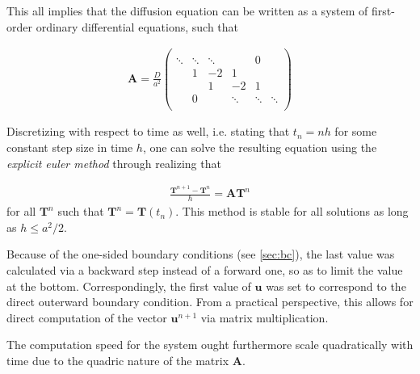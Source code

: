 \documentclass[a4paper,12pt]{article}
\newcommand{\matr}[1]{\mathbf{#1}}
\theoremstyle{plain}
\theoremstyle{definition}
\begin{document}
      This all implies that the diffusion equation can be written as a system of
      first-order ordinary differential equations, such that 

      \begin{align}
         \matr A = \frac{D}{a^2} 
         \left(
         \begin{matrix}
            &&&&& \\
            \ddots & \ddots & \ddots &        & 0      & \\
                   & 1      & -2     & 1      &        & \\
                   &        & 1      & -2     & 1      & \\
                   & 0      &        & \ddots & \ddots & \ddots \\
            &&&&& 
             \end{matrix} \right)
         \label{eq:matrix}
      \end{align}

      Discretizing with respect to time as well, i.e. stating that $t_n = nh$
      for some constant step size in time $h$, one can solve the resulting
      equation using the \emph{explicit euler method} through realizing that
      
      \begin{align}
         \frac{\mathbf T^{n+1} - \mathbf T^n}{h} = \matr A \mathbf T^n
         \label{eq:explicit_euler}
      \end{align}
      for all $\mathbf T^n$ such that $\mathbf T^n = \mathbf T(t_n)$. 
      This method is stable for all solutions as long as $h \leq a^2/2$.  
     
      Because of the one-sided boundary conditions (see \cref{sec:bc}), the last
      value was calculated via a backward step instead of a forward one, so as
      to limit the value at the bottom. Correspondingly, the first value of
      $\mathbf u$ was set to correspond to the direct outerward boundary condition.
      From a practical perspective, this allows for direct computation of the
      vector $\mathbf u^{n+1}$ via matrix multiplication.

      The computation speed for the system ought furthermore scale quadratically
      with time due to the quadric nature of the matrix $\matr A$. 
\end{document}

